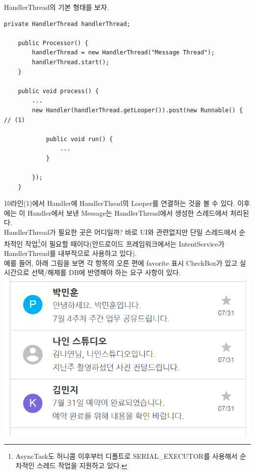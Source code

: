 HandlerThread의 기본 형태를 보자.
\begin{lstlisting}[frame=single] 
	private HandlerThread handlerThread;
	
	public Processor() {
		handlerThread = new HandlerThread("Message Thread");
		handlerThread.start();
	}
	
	public void process() {
		...
		new Handler(handlerThread.getLooper()).post(new Runnable() {  // (1)
		
			public void run() {
				...
			}
			
		});
	}
\end{lstlisting}
10라인(1)에서 Handler에 HandlerThead의 Looper를 연결하는 것을 볼 수 있다. 이후에는 이 Handler에서 보낸 Message는 HandlerThread에서 생성한 스레드에서 처리된다.\\

HandlerThread가 필요한 곳은 어디일까? 
바로 UI와 관련없지만 단일 스레드에서 순차적인 작업\footnote{AsyncTask도  허니콤 이후부터 디폴트로 SERIAL\_EXECUTOR를 사용해서 순차적인 스레드 작업을 지원하고 있다.}이 필요할 때이다(안드로이드 프레임워크에서는 IntentService가 HandlerThread를 내부적으로 사용하고 있다).\\

예를 들어, 아래 그림을 보면 각 항목의 오른 편에 favorite 표시 CheckBox가 있고
실시간으로 선택/해제를 DB에 반영해야 하는 요구 사항이 있다.\\
\includegraphics[scale=0.65]{favorite_sample}

